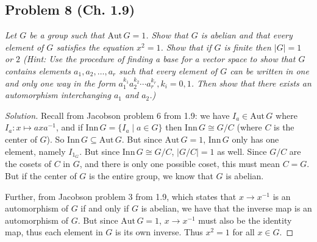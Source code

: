 \documentclass{article}
\begin{document}
\subsection*{Problem 8 (Ch. 1.9)}
{\it Let $G$ be a group such that $\mathrm{Aut}\, G = 1$.
Show that $G$ is abelian and that every element of $G$ satisfies
the equation $x^2 = 1$.
Show that if $G$ is finite then $|G| = 1$ or $2$
(\emph{Hint:} Use the procedure of finding a base for a vector space
to show that $G$ contains elements $a_1,a_2,\dots,a_r$ such that
every element of $G$ can be written in one and only one way in the form
$a_1^{k_1}a_2^{k_2}\cdots a_r^{k_r}, k_i = 0,1$.
Then show that there exists an automorphism interchanging $a_1$ and $a_2$.)}
\begin{proof}[Solution]\let\qed\relax
	Recall from Jacobson problem 6 from 1.9:
	we have $I_a \in \mathrm{Aut}\, G$ where $I_a \colon x \mapsto axa^{-1}$,
	and if $\mathrm{Inn}\, G = \{I_a \mid a \in G\}$ then $\mathrm{Inn}\, G \cong G/C$
	(where $C$ is the center of $G$).
	So $\mathrm{Inn}\, G \subseteq \mathrm{Aut}\, G$.
	But since $\mathrm{Aut}\,G = 1$, $\mathrm{Inn}\, G$ only has one element,
	namely $I_{1_G}$.
	But since $\mathrm{Inn}\, G \cong G/C$, $|G/C| = 1$ as well.
	Since $G/C$ are the cosets of $C$ in $G$,
	and there is only one possible coset,
	this must mean $C = G$.
	But if the center of $G$ is the entire group,
	we know that $G$ is abelian.

	Further, from Jacobson problem 3 from 1.9,
	which states that $x \to x^{-1}$ is an automorphism of $G$
	if and only if $G$ is abelian,
	we have that the inverse map is an automorphism of $G$.
	But since $\mathrm{Aut}\, G = 1$,
	$x \to x^{-1}$ must also be the identity map,
	thus each element in $G$ is its own inverse.
	Thus $x^2 = 1$ for all $x \in G$.


\end{proof}
\end{document}
